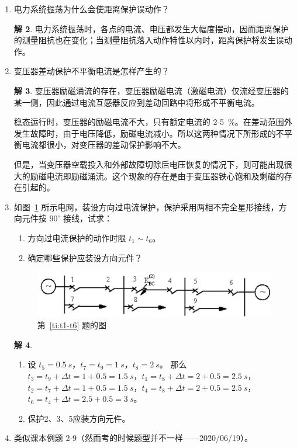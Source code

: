 \documentclass[zihao=-4,fontset = none]{ctexart}
\theoremstyle{definition}
\newtheorem*{solution}{解}
\begin{document}
\begin{enumerate}
\begin{solution}
    单靠保护增大值不能切除保护范围内任意点的故障，因为当故障发生在本线路末端与下级线路的首端出口时，本线路首端的电气量差别不大。所以，为了保证本线路短路时能快速切除而下级线路短路时不动作，这种单靠整定值得保护只能保护线路的一部分。
  \end{solution}
  \item 电力系统振荡为什么会使距离保护误动作？
  \begin{solution}
    电力系统振荡时，各点的电流、电压都发生大幅度摆动，因而距离保护的测量阻抗也在变化；当测量阻抗落入动作特性以内时，距离保护将发生误动作。
  \end{solution}
  \item 变压器差动保护不平衡电流是怎样产生的？
  \begin{solution}
    变压器励磁涌流的存在，变压器励磁电流（激磁电流）仅流经变压器的某一侧，因此通过电流互感器反应到差动回路中将形成不平衡电流。

    稳态运行时，变压器的励磁电流不大，只有额定电流的 2-\SI{5}{\percent}。在差动范围外发生故障时，由于电压降低，励磁电流减小。所以这两种情况下所形成的不平衡电流都很小，对变压器的差动保护影响不大。

    但是，当变压器空载投入和外部故障切除后电压恢复的情况下，则可能出现很大的励磁电流即励磁涌流。这个现象的存在是由于变压器铁心饱和及剩磁的存在引起的。
  \end{solution}
  \item \label{ti:t1-t6}如图~\ref{fig:t1-t6} 所示电网，装设方向过电流保护，保护采用两相不完全星形接线，方向元件按 $90^\circ$ 接线，试求：
  \begin{enumerate}
    \item 方向过电流保护的动作时限 $t_1\sim t_6$。
    \item 确定哪些保护应装设方向元件？
  \end{enumerate}
  \begin{figure}
    \centering
    \includegraphics[width=\textwidth]{t1-t6.png}
    \caption{第~\ref{ti:t1-t6} 题的图}\label{fig:t1-t6}
  \end{figure}
  \begin{solution}
    \begin{enumerate}
      \item 设 $t_5 = \SI{0.5}{s}$，$t_7 = t_9 = \SI{1}{s}$，$t_8 = \SI{2}{s}$。
      那么 $t_3 = t_9 + \Delta t = 1 + 0.5 = \SI{1.5}{s}$，$t_1 = t_8 + \Delta t = 2 + 0.5 = \SI{2.5}{s}$，$t_2 = t_7 + \Delta t = 1 + 0.5 = \SI{1.5}{s}$，$t_4 = t_8 + \Delta t = 2 + 0.5 = \SI{2.5}{s}$，$t_6 = t_4 + \Delta t = 2.5 + 0.5 = \SI{3}{s}$。
      \item 保护2、3、5应装方向元件。
    \end{enumerate}
  \end{solution}
  \item 类似课本例题 2-9（然而考的时候题型并不一样——2020/06/19）。
\end{enumerate}
\end{document}
